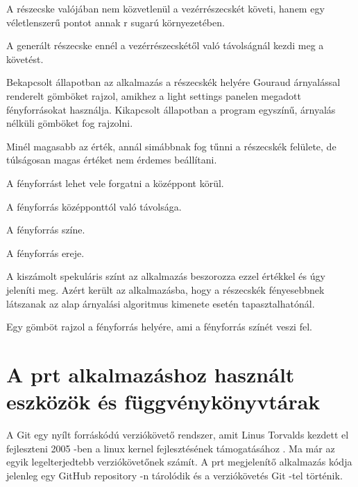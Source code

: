 \begin{description}[font=\normalfont\itshape\space]
\begin{description}[font=\normalfont\itshape\space]
A részecske valójában nem közvetlenül a vezérrészecskét követi, 
hanem egy véletlenszerű pontot annak r sugarú környezetében.
\item [trigger distance:] 
A generált részecske ennél a vezérrészecskétől 
való távolságnál kezdi meg a követést.
\end{description}
\item [\textbf{Light settings panel:}]
\begin{description}[font=\normalfont\itshape\space]
\item []
\item [use lights:] Bekapcsolt állapotban 
az alkalmazás a részecskék helyére 
Gouraud árnyalással renderelt gömböket rajzol, 
amikhez a light settings panelen megadott fényforrásokat használja. 
Kikapcsolt állapotban a program egyszínű, 
árnyalás nélküli gömböket fog rajzolni.
\item [particle smoothness:] 
Minél magasabb az érték, 
annál simábbnak fog tűnni a részecskék felülete, 
de túlságosan magas értéket nem érdemes beállítani.
\item [direction:] 
A fényforrást lehet vele forgatni a középpont körül. 
\item [distance:] 
A fényforrás középponttól való távolsága.
\item [color:] 
A fényforrás színe.
\item [light power:] 
A fényforrás ereje.
\item [specular power:] 
A kiszámolt spekuláris színt 
az alkalmazás beszorozza ezzel értékkel és úgy jeleníti meg. 
Azért került az alkalmazásba, 
hogy a részecskék fényesebbnek látszanak 
az alap árnyalási algoritmus kimenete esetén tapasztalhatónál.
\item [draw sphere:] 
Egy gömböt rajzol a fényforrás helyére, 
ami a fényforrás színét veszi fel.
\end{description}
\end{description}

\section{A prt alkalmazáshoz használt eszközök és függvénykönyvtárak}

\vspace{2mm}


\vspace{2mm}

\noindent A Git egy nyílt forráskódú verziókövető rendszer, 
amit Linus Torvalds kezdett el fejleszteni 2005 -ben 
a linux kernel fejlesztésének támogatásához \cite{wiki:git}. 
Ma már az egyik legelterjedtebb verziókövetőnek számít. 
A prt megjelenítő alkalmazás kódja jelenleg 
egy GitHub repository -n tárolódik és 
a verziókövetés Git -tel történik. 

